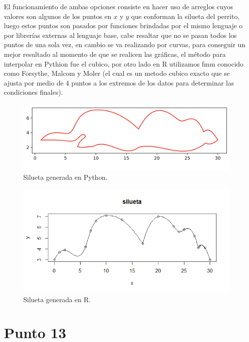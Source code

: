 \documentclass[10pt,letterpaper]{article}
\begin{document}
	El funcionamiento de ambas opciones consiste en hacer uso de arreglos cuyos valores son algunos de los puntos en $x$ y $y$ que conforman la silueta del perrito, luego estos puntos son pasados por funciones brindadas por el mismo lenguaje o por librerías externas al lenguaje base, cabe resaltar que no se pasan todos los puntos de una sola vez, en cambio se va realizando por curvas, para conseguir un mejor resultado al momento de que se realicen las gráficas, el método para interpolar en Pythion fue el cubico, por otro lado en R utilizamos fmm conocido como Forsythe, Malcom y Moler (el cual es un metodo cubico exacto que se ajusta por medio de 4 puntos a los extremos de los  datos para determinar las condiciones finales).\\
	
	\begin{figure}[H]
		\includegraphics[width=\textwidth]{PerroSinPuntos}
		\caption{Silueta generada en Python.}
		\centering
	\end{figure}
	
	\begin{figure}[H]
		\includegraphics[width=\textwidth]{Rplot}
		\caption{Silueta generada en R.}
		\centering
	\end{figure}
	
\section{Punto 13}
	
\end{document}
